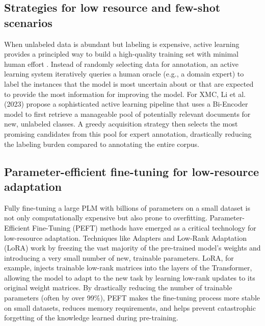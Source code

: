 \subsection{Strategies for low resource and few-shot scenarios}

When unlabeled data is abundant but labeling is expensive, active learning provides a principled way to build a high-quality training set with minimal human effort \cite{li-etal-2023-enhancing-extreme}. Instead of randomly selecting data for annotation, an active learning system iteratively queries a human oracle (e.g., a domain expert) to label the instances that the model is most uncertain about or that are expected to provide the most information for improving the model. For XMC, Li et al. (2023) propose a sophisticated active learning pipeline that uses a Bi-Encoder model to first retrieve a manageable pool of potentially relevant documents for new, unlabeled classes. A greedy acquisition strategy then selects the most promising candidates from this pool for expert annotation, drastically reducing the labeling burden compared to annotating the entire corpus.\cite{li2024surveyDAL}

\subsection{Parameter-efficient fine-tuning for low-resource adaptation}

Fully fine-tuning a large PLM with billions of parameters on a small dataset is not only computationally expensive but also prone to overfitting. Parameter-Efficient Fine-Tuning (PEFT) methods have emerged as a critical technology for low-resource adaptation. \cite{su-etal-2024-unlocking} Techniques like Adapters and Low-Rank Adaptation (LoRA) work by freezing the vast majority of the pre-trained model's weights and introducing a very small number of new, trainable parameters. LoRA, for example, injects trainable low-rank matrices into the layers of the Transformer, allowing the model to adapt to the new task by learning low-rank updates to its original weight matrices. By drastically reducing the number of trainable parameters (often by over 99\%), PEFT makes the fine-tuning process more stable on small datasets, reduces memory requirements, and helps prevent catastrophic forgetting of the knowledge learned during pre-training.~\cite{liu2024alora,razuvayevskaya2024comparison}

